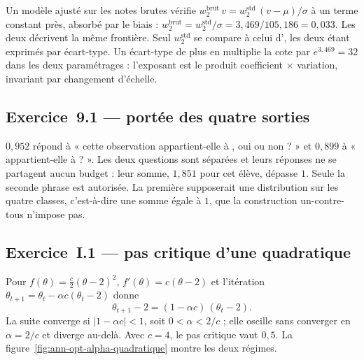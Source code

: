 Un modèle ajusté sur les notes brutes vérifie
$w_2^{\text{brut}}\,v = w_2^{\text{std}}\,(v-\mu)/\sigma$ à un terme constant
près, absorbé par le biais : $w_2^{\text{brut}}=w_2^{\text{std}}/\sigma
=3{,}469/105{,}186=0{,}033$. Les deux décrivent la même frontière. Seul
$w_2^{\text{std}}$ se compare à celui d'\Herb, les deux étant exprimés par
écart-type. Un écart-type de plus en \Runes multiplie la cote par
$e^{3{,}469}=32$ dans les deux paramétrages : l'exposant est le produit
coefficient $\times$ variation, invariant par changement d'échelle.

\subsection*{Exercice~9.1 --- portée des quatre sorties}

$0{,}952$ répond à « cette observation appartient-elle à \Gryf, oui ou non ? » et
$0{,}899$ à « appartient-elle à \Rav ? ». Les deux questions sont séparées et
leurs réponses ne se partagent aucun budget : leur somme, $1{,}851$ pour cet
élève, dépasse $1$. Seule la seconde phrase est autorisée. La première supposerait
une distribution sur les quatre classes, c'est-à-dire une somme égale à $1$, que
la construction un-contre-tous n'impose pas.

\subsection*{Exercice~I.1 --- pas critique d'une quadratique}

Pour $f(\theta)=\tfrac{c}{2}(\theta-2)^2$, $f'(\theta)=c(\theta-2)$ et
l'itération $\theta_{t+1}=\theta_t-\alpha c(\theta_t-2)$ donne
\[
  \theta_{t+1}-2=(1-\alpha c)\,(\theta_t-2).
\]
La suite converge si $|1-\alpha c|<1$, soit $0<\alpha<2/c$ ; elle oscille sans
converger en $\alpha=2/c$ et diverge au-delà. Avec $c=4$, le pas critique vaut
$0{,}5$. La figure~\ref{fig:ann-opt-alpha-quadratique} montre les deux régimes.
